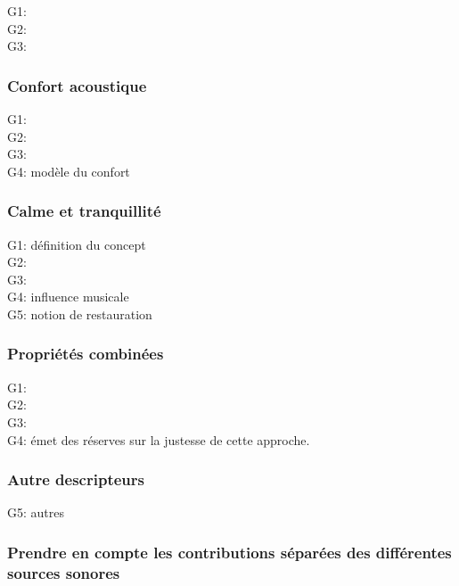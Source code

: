 G1: \citep{garcia2012validation} \\
G2: \citep{lavandier2006contribution}\\
G3: \citep{guillen2007importance}

\subsubsection{Confort acoustique}

G1: \citep{yang2005acoustic,meng2013field}\\
G2: \citep{jeon2011non,jeon2013soundwalk}\\
G3: \citep{tse2012perception}\\
G4: \citep{yu2009modeling} modèle du confort

\subsubsection{Calme et tranquillité}

G1: \citep{delaitre2012definition} définition du concept\\
G2: \citep{pheasant2008acoustic,pheasant2009validation}\\
G3: \citep{memoli2008soundscape}\\
G4: \citep{de2006quiet,de2013characterizing} influence musicale\\
G5: \citep{payne2013production} notion de restauration

\subsubsection{Propriétés combinées}

G1: \citep{davies2013perception}\\
G2: \citep{cain2013development}\\
G3: \citep{axelsson2010principal}\\
G4: \citep{hall2013exploratory} émet des réserves sur la justesse de cette approche.

\subsubsection{Autre descripteurs}

G5: \citep{kang2010semantic} autres

\subsubsection{Prendre en compte les contributions séparées des différentes sources sonores}

